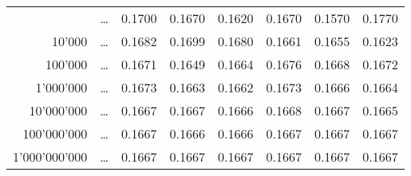 \documentclass[aspectratio=169,mathserif,notheorems]{beamer}%
\begin{document}
\begin{frame}[t]
{\begin{center}
{\begin{tabular}{rccccccc}
{{{{{{{{1'000&\dots&0.1700&0.1670&0.1620&0.1670&0.1570&0.1770\\%
10'000&\dots&0.1682&0.1699&0.1680&0.1661&0.1655&0.1623\\%
100'000&\dots&0.1671&0.1649&0.1664&0.1676&0.1668&0.1672\\%
1'000'000&\dots&0.1673&0.1663&0.1662&0.1673&0.1666&0.1664%
\only<16->{\\10'000'000&\dots&0.1667&0.1667&0.1666&0.1668&0.1667&0.1665\\%
100'000'000&\dots&0.1667&0.1666&0.1666&0.1667&0.1667&0.1667\\%
1'000'000'000&\dots&0.1667&0.1667&0.1667&0.1667&0.1667&0.1667%
}}}}}}}}}\\%
\hline%
\end{tabular}%
}%
\end{center}%
}%
%
%
%
%
%
\end{frame}%
%
\end{document}
